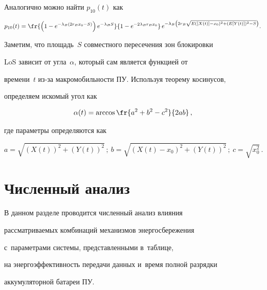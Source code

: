 Аналогично можно найти $p_{10}(t)$ как


$$


p_{10}(t)= \fr{\left(1-e^{-\lambda_B (2r_B x_0-S)}\right)e^{-\lambda_BS}}


{1-e^{-2\lambda_B r_B x_0}}\,e^{-\lambda_B \left(2r_B\sqrt{E([X(t)]-


x_0)^2+(E[Y(t)])^2-S}\right)}.


$$


     


     Заметим, что площадь~$S$ совместного пересечения зон блокировки 


LoS зависит от угла~$\alpha$, который сам является функцией от 


времени~$t$ из-за макромобильности ПУ. Используя теорему косинусов, 


определяем искомый угол как


     $$


     \alpha(t)= \arccos \fr{a^2+b^2-c^2}{2ab}\,,


     $$


где параметры определяются как


$$


a=\sqrt{(X(t))^2+(Y(t))^2}\,;\ b=\sqrt{(X(t)-x_0)^2+(Y(t))^2}\,;\ c=\sqrt{x_0^2}\,.


$$





\section{Численный анализ}


     


     В данном разделе проводится численный анализ влияния  


рас\-смат\-ри\-ва\-емых комбинаций механизмов энергосбережения  


с~па\-ра\-мет\-ра\-ми сис\-те\-мы, представленными в~таб\-ли\-це,  


на энер\-го\-эф\-фек\-тив\-ность передачи данных и~время полной разрядки 


аккумуляторной батареи ПУ.





